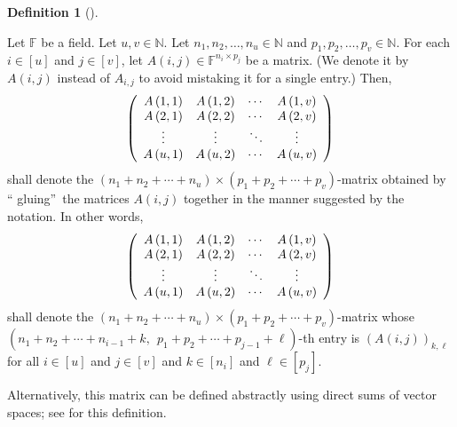 \documentclass[numbers=enddot,12pt,final,onecolumn,notitlepage]{scrartcl}%
\numberwithin{exer}{subsection}
\theoremstyle{definition}
\newtheorem{defi}[theo]{Definition}
\newenvironment{definition}[1][]
{\begin{defi}[#1]\begin{leftbar}}
{\end{leftbar}\end{defi}}
\begin{document}
\begin{definition}
\label{def.blockmatrix.uxv}Let $\mathbb{F}$ be a field. Let $u,v\in\mathbb{N}%
$. Let $n_{1},n_{2},\ldots,n_{u}\in\mathbb{N}$ and $p_{1},p_{2},\ldots
,p_{v}\in\mathbb{N}$. For each $i\in\left[  u\right]  $ and $j\in\left[
v\right]  $, let $A\left(  i,j\right)  \in\mathbb{F}^{n_{i}\times p_{j}}$ be a
matrix. (We denote it by $A\left(  i,j\right)  $ instead of $A_{i,j}$ to avoid
mistaking it for a single entry.) Then,%
\begin{equation}
\left(
\begin{array}
[c]{cccc}%
A\left(  1,1\right)  & A\left(  1,2\right)  & \cdots & A\left(  1,v\right) \\
A\left(  2,1\right)  & A\left(  2,2\right)  & \cdots & A\left(  2,v\right) \\
\vdots & \vdots & \ddots & \vdots\\
A\left(  u,1\right)  & A\left(  u,2\right)  & \cdots & A\left(  u,v\right)
\end{array}
\right)  \label{eq.def.blockmatrix.uxv.blockmat}%
\end{equation}
shall denote the $\left(  n_{1}+n_{2}+\cdots+n_{u}\right)  \times\left(
p_{1}+p_{2}+\cdots+p_{v}\right)  $-matrix obtained by \textquotedblleft
gluing\textquotedblright\ the matrices $A\left(  i,j\right)  $ together in the
manner suggested by the notation. In other words,%
\[
\left(
\begin{array}
[c]{cccc}%
A\left(  1,1\right)  & A\left(  1,2\right)  & \cdots & A\left(  1,v\right) \\
A\left(  2,1\right)  & A\left(  2,2\right)  & \cdots & A\left(  2,v\right) \\
\vdots & \vdots & \ddots & \vdots\\
A\left(  u,1\right)  & A\left(  u,2\right)  & \cdots & A\left(  u,v\right)
\end{array}
\right)
\]
shall denote the $\left(  n_{1}+n_{2}+\cdots+n_{u}\right)  \times\left(
p_{1}+p_{2}+\cdots+p_{v}\right)  $-matrix whose $\left(  n_{1}+n_{2}%
+\cdots+n_{i-1}+k,\ \ p_{1}+p_{2}+\cdots+p_{j-1}+\ell\right)  $-th entry is
$\left(  A\left(  i,j\right)  \right)  _{k,\ell}$ for all $i\in\left[
u\right]  $ and $j\in\left[  v\right]  $ and $k\in\left[  n_{i}\right]  $ and
$\ell\in\left[  p_{j}\right]  $.
\end{definition}

Alternatively, this matrix can be defined abstractly using direct sums of
vector spaces; see \cite[Chapter II, \S 10, section 2]{Bourba74} for this definition.
\end{document}
